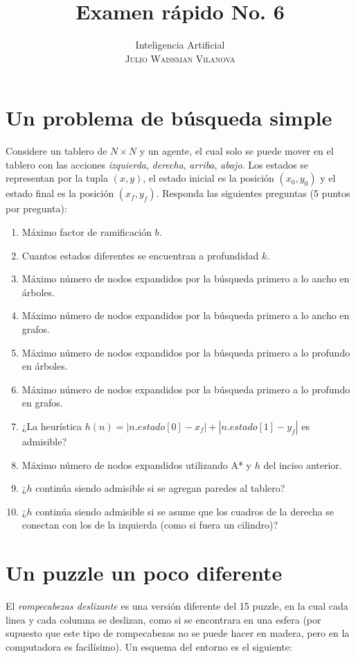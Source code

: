 \documentclass[onecolumn, letter, 12pt]{article}
\title{Examen rápido No. 6}
\author{Inteligencia Artificial\\ \textsc{Julio Waissman Vilanova}}
\date{}
\begin{document}
\maketitle

\section*{Un problema de búsqueda simple}

Considere un tablero de $N\times N$ y un agente, el cual solo se puede mover en el tablero
con las acciones \emph{izquierda}, \emph{derecha}, \emph{arriba}, \emph{abajo}. Los
estados se representan por la tupla $(x,y)$, el estado inicial es la posición $(x_0,y_0)$
y el estado final es la posición $(x_f,y_f)$.  Responda las siguientes preguntas (5 puntos
por pregunta):

\begin{enumerate}
\item Máximo factor de ramificación $b$.
\item Cuantos estados diferentes se encuentran a profundidad $k$.
\item Máximo número de nodos expandidos por la búsqueda primero a lo ancho en árboles.
\item Máximo número de nodos expandidos por la búsqueda primero a lo ancho en grafos.
\item Máximo número de nodos expandidos por la búsqueda primero a lo profundo en árboles.
\item Máximo número de nodos expandidos por la búsqueda primero a lo profundo en grafos.
\item ¿La heurística $h(n) = |n.estado[0] - x_f| + |n.estado[1] - y_f|$ es admisible? 
\item Máximo número de nodos expandidos utilizando A* y $h$ del inciso anterior.
\item ¿$h$ continúa siendo admisible si se agregan paredes al tablero?
\item ¿$h$ continúa siendo admisible si se asume que los cuadros de la derecha se conectan con los de la izquierda (como si fuera un cilindro)?
\end{enumerate}

\newpage

\section*{Un puzzle un poco diferente}

El \emph{rompecabezas deslizante} es una versión diferente del 15 puzzle, en la cual cada linea y cada columna se deslizan, como si se encontrara en una esfera (por supuesto que este tipo de rompecabezas no se puede hacer en madera, pero en la computadora es facilísimo). Un esquema del entorno es el siguiente:
\end{document}
